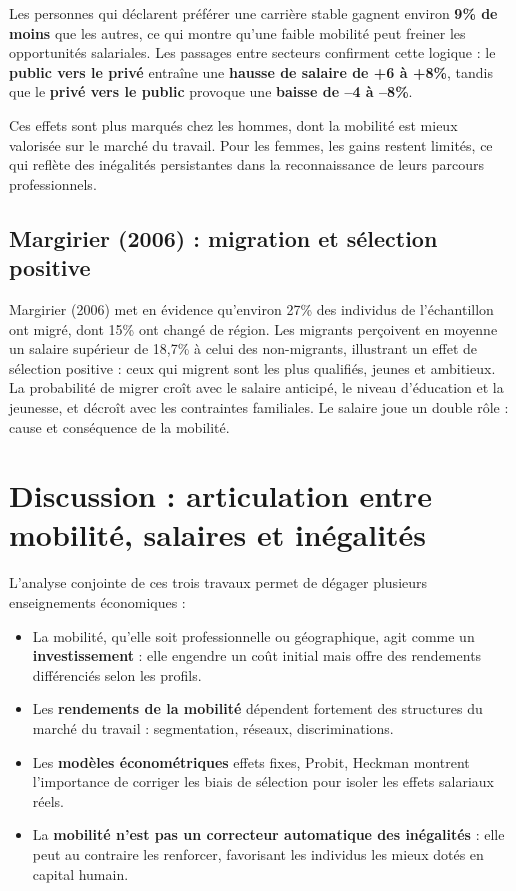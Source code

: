 \documentclass[12pt,a4paper]{article}
\begin{document}
Les personnes qui déclarent préférer une carrière stable gagnent environ \textbf{9\% de moins} que les autres, ce qui montre qu’une faible mobilité peut freiner les opportunités salariales. Les passages entre secteurs confirment cette logique : le \textbf{public vers le privé} entraîne une \textbf{hausse de salaire de +6 à +8\%}, tandis que le \textbf{privé vers le public} provoque une \textbf{baisse de --4 à --8\%}.  

Ces effets sont plus marqués chez les hommes, dont la mobilité est mieux valorisée sur le marché du travail. Pour les femmes, les gains restent limités, ce qui reflète des inégalités persistantes dans la reconnaissance de leurs parcours professionnels.


\subsection{Margirier (2006) : migration et sélection positive}

Margirier (2006) met en évidence qu’environ 27\% des individus de l’échantillon ont migré, dont 15\% ont changé de région.  
Les migrants perçoivent en moyenne un salaire supérieur de 18,7\% à celui des non-migrants, illustrant un effet de sélection positive : ceux qui migrent sont les plus qualifiés, jeunes et ambitieux.  
La probabilité de migrer croît avec le salaire anticipé, le niveau d’éducation et la jeunesse, et décroît avec les contraintes familiales.  
Le salaire joue un double rôle : cause et conséquence de la mobilité.

\section{Discussion : articulation entre mobilité, salaires et inégalités}

L’analyse conjointe de ces trois travaux permet de dégager plusieurs enseignements économiques :

\begin{itemize}
    \item La mobilité, qu’elle soit professionnelle ou géographique, agit comme un \textbf{investissement} : elle engendre un coût initial mais offre des rendements différenciés selon les profils.
    \item Les \textbf{rendements de la mobilité} dépendent fortement des structures du marché du travail : segmentation, réseaux, discriminations.
    \item Les \textbf{modèles économétriques}  effets fixes, Probit, Heckman  montrent l’importance de corriger les biais de sélection pour isoler les effets salariaux réels.
    \item La \textbf{mobilité n’est pas un correcteur automatique des inégalités} : elle peut au contraire les renforcer, favorisant les individus les mieux dotés en capital humain.
\end{itemize}
\end{document}
